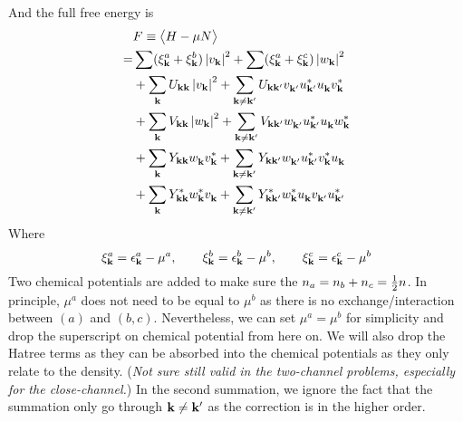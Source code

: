 And the full free energy is 
\begin{equation}\label{eq:uvw:F}
 \begin{split}
  &F\equiv\bigl<{H-\mu{}N}\bigr>\\
    =&\sum(\xi^a_{\mathbf{k}}+\xi^b_{\mathbf{k}})\left\lvert{v_{\ensuremath{\mathbf{k}}}}\right\rvert^2+\sum(\xi^a_{\mathbf{k}}+\xi^c_{\mathbf{k}})\left\lvert{w_{\ensuremath{\mathbf{k}}}}\right\rvert^2\\
    &+\sum_{\mathbf{k}}U_{\mathbf{k}\mathbf{k}}\left\lvert{v_{\ensuremath{\mathbf{k}}}}\right\rvert^2+\sum_{\mathbf{k}\neq\mathbf{k}'}U_{\mathbf{k}\mathbf{k}'}v^{}_{\mathbf{k}'}u^*_{\mathbf{k}'}u^{}_{\mathbf{k}}{}v^*_{\mathbf{k}}\\
    &+\sum_{\mathbf{k}}V_{\mathbf{k}\mathbf{k}}\left\lvert{w_{\ensuremath{\mathbf{k}}}}\right\rvert^2
      +\sum_{\mathbf{k}\neq\mathbf{k}'}V_{\mathbf{k}\mathbf{k}'}w^{}_{\mathbf{k}'}u^*_{\mathbf{k}'}u^{}_{\mathbf{k}}{}w^*_{\mathbf{k}}\\
    &+\sum_{\mathbf{k}}Y_{\mathbf{k}\mathbf{k}}w^{}_{\mathbf{k}}v^*_{\mathbf{k}}{}
      +\sum_{\mathbf{k}\neq\mathbf{k}'}Y_{\mathbf{k}\mathbf{k}'}w^{}_{\mathbf{k}'}{u^{*}_{\mathbf{k}'}}v^*_{\mathbf{k}}{}u^{}_{\mathbf{k}}\\
    &+\sum_{\mathbf{k}}Y^*_{\mathbf{k}\mathbf{k}}w^*_{\mathbf{k}}v^{}_{\mathbf{k}}{}
      +\sum_{\mathbf{k}\neq\mathbf{k}'}Y^*_{\mathbf{k}\mathbf{k}'}w^*_{\mathbf{k}}{u^{}_{\mathbf{k}}}v^{}_{\mathbf{k}'}{}u^{*}_{\mathbf{k}'}
 \end{split}
\end{equation}
Where 
\begin{equation*}
 \xi^a_{\mathbf{k}}=\epsilon^a_{\mathbf{k}}-\mu^a,\qquad\xi^b_{\mathbf{k}}=\epsilon^b_{\mathbf{k}}-\mu^b,\qquad\xi^c_{\mathbf{k}}=\epsilon^c_{\mathbf{k}}-\mu^b
\end{equation*}
Two chemical potentials are added to make sure the $n_a=n_b+n_c=\frac{1}{2}n$.  In principle, $\mu^{a}$ does not need to be equal to $\mu^{b}$  as there is no exchange/interaction between $(a)$ and $(b,c)$.  Nevertheless, we can set $\mu^{a}=\mu^{b}$ for simplicity and drop the superscript on chemical potential from here on. 
We will also drop the Hatree terms as they can be absorbed into the chemical potentials as they only relate to the density.  (\emph{Not sure still valid in the two-channel problems, especially for the close-channel.})   In the second summation, we ignore the fact that the summation only go through $\mathbf{k}\neq\mathbf{k}'$ as the correction is in the higher order. 
 
